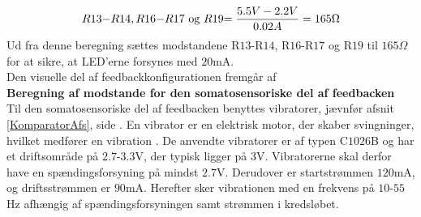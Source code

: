 
\begin{equation}
R$13$-R$14$, R$16$-R$17$\text{ og }R$19$ = \dfrac{5.5V - 2.2V}{0.02A} = 165\Omega
\end{equation}
\noindent Ud fra denne beregning sættes modstandene R$13$-R$14$, R$16$-R$17$ og R$19$ til $165\Omega$ for at sikre, at LED'erne forsynes med $20$mA. \\
Den visuelle del af feedbackkonfigurationen fremgår af  \\



\noindent\textbf{Beregning af modstande for den somatosensoriske del af feedbacken} \\
Til den somatosensoriske del af feedbacken benyttes vibratorer, jævnfør afsnit \ref{KomparatorAfs}, side \pageref{KomparatorAfs}. En vibrator er en elektrisk motor, der skaber svingninger, hvilket medfører en vibration \cite{Redaktionen2009}. De anvendte vibratorer er af typen C$1026$B og har et driftsområde på $2.7$-$3.3$V, der typisk ligger på $3$V. Vibratorerne skal derfor have en spændingsforsyning på mindst $2.7$V. Derudover er startstrømmen $120$mA, og driftsstrømmen er $90$mA. Herefter sker vibrationen med en frekvens på $10$-$55$Hz afhængig af spændingsforsyningen samt strømmen i kredsløbet. \cite{Machinery2009} %

